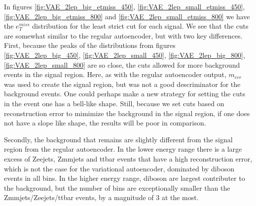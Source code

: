 In figures \ref{fig:VAE_2lep_big_etmiss_450}, \ref{fig:VAE_2lep_small_etmiss_450}, 
\ref{fig:VAE_2lep_big_etmiss_800} and  \ref{fig:VAE_2lep_small_etmiss_800} we have 
the $e_T^{miss}$ distribution for the least strict cut for each signal. We see that 
the cuts are somewhat similar to the regular autoencoder, but with two key differences.
First, because the peaks of the distributions from figures \ref{fig:VAE_2lep_big_450}, 
\ref{fig:VAE_2lep_small_450}, \ref{fig:VAE_2lep_big_800}, \ref{fig:VAE_2lep_small_800} 
are so close, the cuts allowed for more background events in the signal region. Here, 
as with the regular autoencoder output, $m_{err}$ was used to create the signal region, 
but was not a good descriminator for the background events. One could perhaps make a new 
strategy for setting the cuts in the event one has a bell-like shape. Still, because we set 
cuts based on reconstruction error to mimimize the background in the signal region, 
if one does not have a slope like shape, the results will be poor in comparison. \par
Secondly, the background that remains are slightly 
different from the signal region from the regular autoencoder. In the lower energy range there 
is a large excess of Zeejets, Zmmjets and ttbar events that have a high reconstruction error, 
which is not the case for the variational autoencoder, dominated by diboson events in all bins. 
In the higher energy range, diboson are largest contributer to the background, but the number 
of bins are exceptionally smaller than the Zmmjets/Zeejets/ttbar events, by a magnitude of 3 at the most. 








